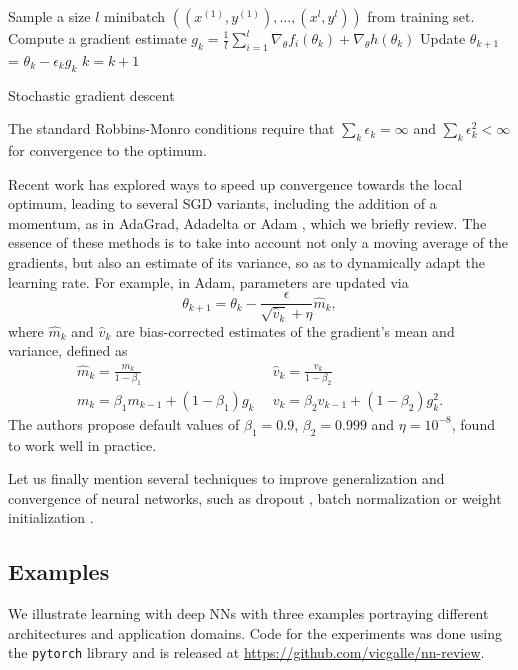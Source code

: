 \begin{algorithm}[!ht]
\begin{algorithmic}
  \State Sample a size $l$ minibatch 
      $((x^{(1)}, y^{(1)}),..., (x^{l},y^{l})) $
              from training set. 
\State Compute a gradient estimate
      $g_k = \frac{1}{l} \sum_{i=1}^l \nabla_{\theta} f_i(\theta_k) + \nabla_{\theta} h(\theta_k)$
\State    Update $\theta_{k+1} $ = $\theta_k -\epsilon _k g_k$ 
\State    $k=k+1$ 
 \EndWhile
\end{algorithmic}
 \caption{Stochastic gradient descent}\label{alg:sgd}
\end{algorithm}

\noindent The standard Robbins-Monro conditions require
that $\sum _k \epsilon_k = \infty$ and 
$\sum _k \epsilon _k^2 < \infty $ for convergence to the optimum.

Recent work has explored ways to 
speed up convergence towards the local optimum, 
leading to several SGD variants, including the 
 addition of a momentum, as in AdaGrad, Adadelta or Adam \cite{kingma2014adam}, which we briefly review. The essence of these methods is to take into account not only a moving average of the gradients, but also an estimate of its variance, so as to dynamically adapt the learning rate. For example, in Adam, 
  parameters are updated via 
$$
\theta_{k+1} = \theta_k - \frac{\epsilon}{\sqrt{\hat{v}_k} + \eta} \hat{m}_k,
$$
where $\hat{m}_k$ and $\hat{v}_k$ are bias-corrected estimates of the gradient's mean and variance, defined as
\begin{align*}
    \hat{m}_k = \frac{m_k}{1 - \beta_{1}} &  \,\,\, \hat{v}_k = \frac{v_k}{1 - \beta_{2}} \\
    m_k = \beta_1 m_{k-1} + (1 - \beta_1)g_k &  \,\,\, v_k = \beta_2 v_{k-1} + (1 - \beta_2)g_k^2.
\end{align*}
The authors propose default values of $\beta_1 = 0.9$, $\beta_2 = 0.999$ and $\eta = 10^{-8}$, found to work well in practice.


Let us finally mention 
several techniques to improve generalization and convergence of neural networks, such as dropout \cite{srivastava2014dropout}, batch normalization \cite{ioffe2015batch} or weight initialization \cite{glorot2010understanding}.



\subsection{Examples}
We illustrate learning with deep NNs with three examples portraying
different architectures and application domains. Code for the experiments was done using the \texttt{pytorch} library \cite{torch} and is released at \url{https://github.com/vicgalle/nn-review}.

